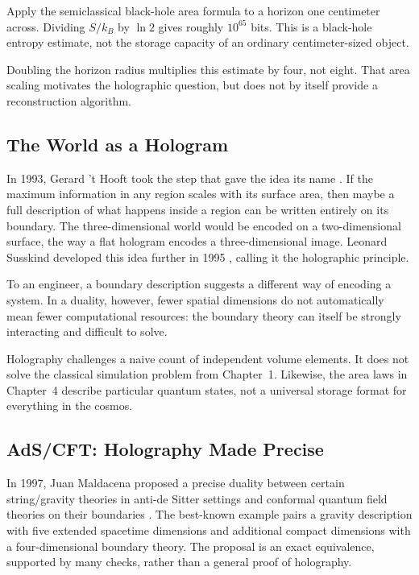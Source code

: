 \begin{examplebox}
Apply the semiclassical black-hole area formula to a horizon one centimeter across. Dividing \(S/k_B\) by \(\ln 2\) gives roughly \(10^{65}\) bits. This is a black-hole entropy estimate, not the storage capacity of an ordinary centimeter-sized object.

Doubling the horizon radius multiplies this estimate by four, not eight. That area scaling motivates the holographic question, but does not by itself provide a reconstruction algorithm.
\end{examplebox}

\subsection{The World as a Hologram}

In 1993, Gerard 't Hooft took the step that gave the idea its name \cite{thooft1993}. If the maximum information in any region scales with its surface area, then maybe a full description of what happens inside a region can be written entirely on its boundary. The three-dimensional world would be encoded on a two-dimensional surface, the way a flat hologram encodes a three-dimensional image. Leonard Susskind developed this idea further in 1995 \cite{susskind1995}, calling it the holographic principle.

To an engineer, a boundary description suggests a different way of encoding a system. In a duality, however, fewer spatial dimensions do not automatically mean fewer computational resources: the boundary theory can itself be strongly interacting and difficult to solve.

Holography challenges a naive count of independent volume elements. It does not solve the classical simulation problem from Chapter~1. Likewise, the area laws in Chapter~4 describe particular quantum states, not a universal storage format for everything in the cosmos.

\subsection{AdS/CFT: Holography Made Precise}

In 1997, Juan Maldacena proposed a precise duality between certain string/gravity theories in anti-de Sitter settings and conformal quantum field theories on their boundaries \cite{maldacena1998}. The best-known example pairs a gravity description with five extended spacetime dimensions and additional compact dimensions with a four-dimensional boundary theory. The proposal is an exact equivalence, supported by many checks, rather than a general proof of holography.

